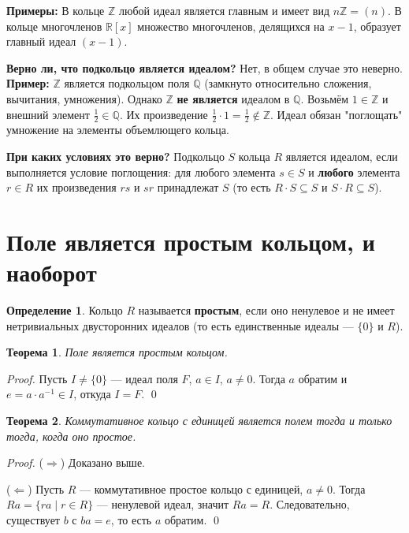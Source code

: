 \documentclass[12pt, a4paper]{article}
\newtheorem{theorem}{Теорема}
\theoremstyle{definition}
\newtheorem{definition}{Определение}
\theoremstyle{remark}
\begin{document}
\textbf{Примеры:} В кольце $\mathbb{Z}$ любой идеал является главным и имеет вид $n\mathbb{Z} = (n)$. В кольце многочленов $\mathbb{R}[x]$ множество многочленов, делящихся на $x-1$, образует главный идеал $(x-1)$.

\textbf{Верно ли, что подкольцо является идеалом?} 
Нет, в общем случае это неверно. 
\textbf{Пример:} $\mathbb{Z}$ является подкольцом поля $\mathbb{Q}$ (замкнуто относительно сложения, вычитания, умножения). Однако $\mathbb{Z}$ \textbf{не является} идеалом в $\mathbb{Q}$. Возьмём $1 \in \mathbb{Z}$ и внешний элемент $\frac{1}{2} \in \mathbb{Q}$. Их произведение $\frac{1}{2} \cdot 1 = \frac{1}{2} \notin \mathbb{Z}$. Идеал обязан "поглощать" умножение на элементы объемлющего кольца.

\textbf{При каких условиях это верно?} 
Подкольцо $S$ кольца $R$ является идеалом, если выполняется условие поглощения: для любого элемента $s \in S$ и \textbf{любого} элемента $r \in R$ их произведения $rs$ и $sr$ принадлежат $S$ (то есть $R \cdot S \subseteq S$ и $S \cdot R \subseteq S$).

\section{Поле является простым кольцом, и наоборот}

\begin{definition}
	Кольцо $R$ называется \textbf{простым}, если оно ненулевое и не имеет нетривиальных двусторонних идеалов (то есть единственные идеалы --- $\{0\}$ и $R$).
\end{definition}

\begin{theorem}
	Поле является простым кольцом.
\end{theorem}
\begin{proof}
	Пусть $I \neq \{0\}$ --- идеал поля $F$, $a \in I$, $a \neq 0$. Тогда $a$ обратим и $e = a \cdot a^{-1} \in I$, откуда $I = F$. \qed
\end{proof}

\begin{theorem}
	Коммутативное кольцо с единицей является полем тогда и только тогда, когда оно простое.
\end{theorem}
\begin{proof}
	($\Rightarrow$) Доказано выше.
	
	($\Leftarrow$) Пусть $R$ --- коммутативное простое кольцо с единицей, $a \neq 0$. Тогда $Ra = \{ra \mid r \in R\}$ --- ненулевой идеал, значит $Ra = R$. Следовательно, существует $b$ с $ba = e$, то есть $a$ обратим. \qed
\end{proof}
\end{document}
